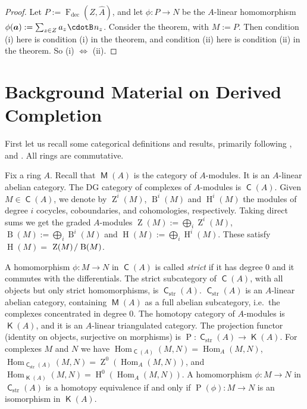 \documentclass[10pt]{amsart}
\theoremstyle{definition}
\numberwithin{equation}{section}
\newcommand{\opn}{\operatorname}
\newcommand{\cat}[1]{\operatorname{\mathsf{#1}}}
\newcommand{\cd}{\mspace{1.3mu}{\cdotB}\mspace{1.3mu}}
\newcommand{\mrm}[1]{\mathrm{#1}}
\newcommand{\ba}{\bsym{a}}
\newcommand{\bsym}[1]{\boldsymbol{#1}}
\newcommand{\boplus}{\bigoplus\nolimits}
\newcommand{\what}[1]{\widehat{#1}}
\newcommand{\msp}[1]{\mspace{#1 mu}}
\begin{document}
\begin{proof}
Let $P := \opn{F}_{\mrm{dec}}(Z, \what{A})$, and let
$\phi : P \to N$ be the $A$-linear homomorphism
$\phi(\ba) := \sum_{z \in Z} a_z \cd n_z$.
Consider the theorem, with $M := P$.
Then condition (i) here is condition (i) in the theorem, and condition (ii)
here is condition (ii) in the theorem. So
(i) $\Leftrightarrow$ (ii).
\end{proof}



\section{Background Material on Derived Completion}
\label{sec:back-der}

First let us recall some categorical definitions and results, primarily
following \cite{PSY1}, \cite{Ye5} and \cite{Ye6}.
All rings are commutative.

Fix a ring $A$. Recall that $\cat{M}(A)$ is the category of
$A$-modules. It is
an $A$-linear abelian category. The DG category of complexes of $A$-modules is
$\cat{C}(A)$.
Given $M \in \cat{C}(A)$, we denote by $\opn{Z}^i(M)$,
$\opn{B}^i(M)$ and $\opn{H}^i(M)$ the modules of degree $i$ cocycles,
coboundaries, and cohomologies, respectively.
Taking direct sums we get the graded $A$-modules
$\opn{Z}(M) := \boplus_i \opn{Z}^i(M)$,
$\opn{B}(M) := \boplus_i \opn{B}^i(M)$ and
$\opn{H}(M) := \boplus_i \opn{H}^i(M)$.
These satisfy
$\opn{H}(M) =$ $\opn{Z}(M) \msp{2} / \msp{2} \opn{B}(M)$.

A homomorphism $\phi : M \to N$ in $\cat{C}(A)$ is called {\em strict}
if it has degree $0$ and it commutes with the differentials.
The strict subcategory of $\cat{C}(A)$, with all objects but only strict
homomorphisms, is $\cat{C}_{\mrm{str}}(A)$.  $\cat{C}_{\mrm{str}}(A)$ is an
$A$-linear abelian category, containing $\cat{M}(A)$ as a full abelian
subcategory, i.e.\ the complexes concentrated in degree $0$.
The homotopy category of $A$-modules is $\cat{K}(A)$, and it is an $A$-linear
triangulated category.
The projection functor (identity on objects, surjective on morphisms) is
$\opn{P} : \cat{C}_{\mrm{str}}(A) \to \cat{K}(A)$.
For complexes $M$ and $N$ we have
$\opn{Hom}_{\cat{C}(A)}(M, N) = \opn{Hom}_{A}(M, N)$,
$\opn{Hom}_{\cat{C}_{\mrm{str}}(A)}(M, N) = \opn{Z}^0(\opn{Hom}_{A}(M, N))$,
and
$\opn{Hom}_{\cat{K}(A)}(M, N) = \opn{H}^0(\opn{Hom}_{A}(M, N))$.
A homomorphism $\phi : M \to  N$ in $\cat{C}_{\mrm{str}}(A)$ is a homotopy
equivalence if and only if
$\opn{P}(\phi) : M \to N$ is an isomorphism in $\cat{K}(A)$.
\end{document}
